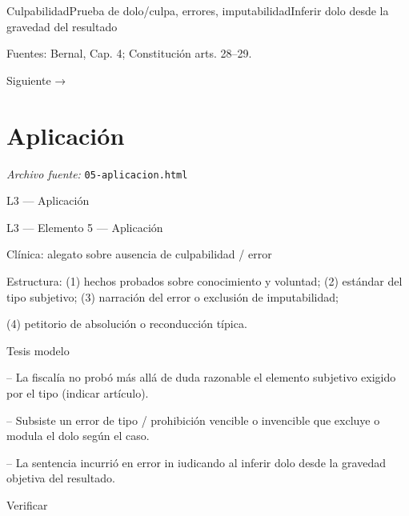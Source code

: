 \documentclass[11pt,a4paper]{article}
\begin{document}
          CulpabilidadPrueba de dolo/culpa, errores, imputabilidadInferir dolo desde la gravedad del resultado\par







    Fuentes: Bernal, Cap. 4; Constitución arts. 28–29.\par

    Siguiente →\par

\section{Aplicaci\'on}
\noindent\textit{Archivo fuente:} \texttt{05-aplicacion.html}

L3 — Aplicación\par





    L3 — Elemento 5 — Aplicación\par
    Clínica: alegato sobre ausencia de culpabilidad / error\par


      Estructura: (1) hechos probados sobre conocimiento y voluntad; (2) estándar del tipo subjetivo; (3) narración del error o exclusión de imputabilidad;\par
      (4) petitorio de absolución o reconducción típica.\par



      Tesis modelo\par



-- La fiscalía no probó más allá de duda razonable el elemento subjetivo exigido por el tipo (indicar artículo).\par


-- Subsiste un error de tipo / prohibición vencible o invencible que excluye o modula el dolo según el caso.\par


-- La sentencia incurrió en error in iudicando al inferir dolo desde la gravedad objetiva del resultado.\par







      Verificar\par
\end{document}

